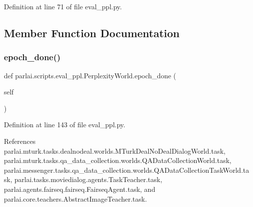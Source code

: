 Definition at line 71 of file eval\+\_\+ppl.\+py.



\subsection{Member Function Documentation}
\mbox{\label{classparlai_1_1scripts_1_1eval__ppl_1_1PerplexityWorld_a6308290f51351f01a0457b586d552a1c}} 
\subsubsection{\texorpdfstring{epoch\+\_\+done()}{epoch\_done()}}
{\footnotesize\ttfamily def parlai.\+scripts.\+eval\+\_\+ppl.\+Perplexity\+World.\+epoch\+\_\+done (\begin{DoxyParamCaption}\item[{}]{self }\end{DoxyParamCaption})}



Definition at line 143 of file eval\+\_\+ppl.\+py.



References parlai.\+mturk.\+tasks.\+dealnodeal.\+worlds.\+M\+Turk\+Deal\+No\+Deal\+Dialog\+World.\+task, parlai.\+mturk.\+tasks.\+qa\+\_\+data\+\_\+collection.\+worlds.\+Q\+A\+Data\+Collection\+World.\+task, parlai.\+messenger.\+tasks.\+qa\+\_\+data\+\_\+collection.\+worlds.\+Q\+A\+Data\+Collection\+Task\+World.\+task, parlai.\+tasks.\+moviedialog.\+agents.\+Task\+Teacher.\+task, parlai.\+agents.\+fairseq.\+fairseq.\+Fairseq\+Agent.\+task, and parlai.\+core.\+teachers.\+Abstract\+Image\+Teacher.\+task.

\mbox{\label{classparlai_1_1scripts_1_1eval__ppl_1_1PerplexityWorld_aed2ab6313608418defd2b167c1893e96}} 

